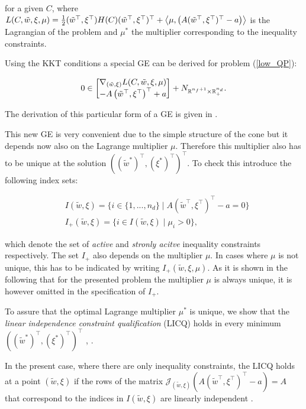 for a given \(C\), where \(L(C,\tilde{w},\xi,\mu) = \frac{1}{2}(\tilde{w}^{\top},\xi^{\top})H(C)(\tilde{w}^{\top},\xi^{\top})^{\top}+\left\langle\mu,\left(A (\tilde{w}^{\top},\xi^{\top})^{\top} - a\right)\right\rangle\) is the Lagrangian of the problem and \(\mu^*\) the multiplier corresponding to the inequality constraints.

Using the KKT conditions a special GE can be derived for problem (\ref{low_QP}):

\begin{equation}
	0 \in \begin{bmatrix} \nabla_{(\tilde{w},\xi)}L(C,\tilde{w},\xi,\mu)\\ - A \left(\tilde{w}^{\top},\xi^{\top}\right)^{\top} + a\end{bmatrix} + N_{\mathbb{R}^{n_f+1}\times\mathbb{R}^{n_d}_+}.
\label{GE}
\end{equation}

The derivation of this particular form of a GE is given in \cite[chapter 4, p. 71--72 and chapter 5, p. 92]{Outrata1998}.

This new GE is very convenient due to the simple structure of the cone but it depends now also on the Lagrange multiplier \(\mu\). Therefore this multiplier also has to be unique at the solution \(((\tilde{w}^*)^{\top},(\xi^*)^{\top})^{\top}\).
To check this introduce the following index sets:

\begin{align*}
	& I(\tilde{w},\xi) = \{i \in \{1,...,n_d\} \mid A (\tilde{w}^{\top},\xi^{\top})^{\top} - a = 0\} \\
	& I_+(\tilde{w},\xi) = \{i\in I(\tilde{w},\xi) \mid \mu_i > 0\},
\end{align*}

which denote the set of \emph{active} and \emph{stronly acitve} inequality constraints respectively.
The set \(I_+\) also depends on the multiplier \(\mu\). In cases where \(\mu\) is not unique, this has to be indicated by writing \(I_+(\tilde{w},\xi,\mu)\).  As it is shown in the following that for the presented problem the multiplier \(\mu\) is always unique, it is however omitted in the specification of \(I_+\). 

To assure that the optimal Lagrange multiplier \(\mu^*\) is unique, we show that the \emph{linear independence constraint qualification} (LICQ) holds in every minimum  \(((\tilde{w}^*)^{\top},(\xi^*)^{\top})^{\top}\) \cite[Theorem 4.8, p. 82]{Outrata1998}, \cite[Theorem 1, p. 3]{Wachsmuth2013}.

In the present case, where there are only inequality constraints, the LICQ holds at a point \((\tilde{w},\xi)\) if the rows of the matrix \(\mathcal{J}_{(\tilde{w},\xi)}\left(A(\tilde{w}^{\top},\xi^{\top})^{\top} - a\right) = A\) that correspond to the indices in \(I(\tilde{w},\xi)\) are linearly independent \cite[p. 82, 96]{Outrata1998}.

